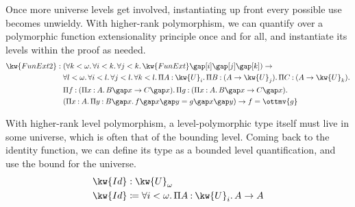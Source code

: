 \documentclass[a4paper,UKenglish,cleveref,autoref,thm-restate]{lipics-v2021}
\begin{document}
Once more universe levels get involved,
instantiating up front every possible use becomes unwieldy.
With higher-rank polymorphism,
we can quantify over a polymorphic function extensionality principle once and for all,
and instantiate its levels within the proof as needed.
%
\begin{align*}
   \kw{ FunExt2 }  &:   (     \forall  k  <   \omega   \mathpunct{.}   \forall  i  <  k  \mathpunct{.}   \forall  j  <  k  \mathpunct{.}   \kw{ FunExt }      \gap [  i  ]   \gap [  j  ]   \gap [  k  ]  )   \to   \relax   \\
  &\phantom{{} : {}}  \forall  l  <   \omega   \mathpunct{.}   \forall  i  <  l  \mathpunct{.}   \forall  j  <  l  \mathpunct{.}   \forall  k  <  l  \mathpunct{.}   \Pi  A  \mathbin{:}   \kw{U}_{ i }   \mathpunct{.}   \Pi  B  \mathbin{:}   (  A  \to   \kw{U}_{ j }   )   \mathpunct{.}   \Pi  C  \mathbin{:}   (  A  \to   \kw{U}_{ k }   )   \mathpunct{.}   \relax         \\
  &\phantom{{} : {}}  \Pi  f  \mathbin{:}   (     \Pi  x  \mathbin{:}  A  \mathpunct{.}  B   \gap  x   \to  C   \gap  x  )   \mathpunct{.}   \Pi  g  \mathbin{:}   (     \Pi  x  \mathbin{:}  A  \mathpunct{.}  B   \gap  x   \to  C   \gap  x  )   \mathpunct{.}   \relax    \\
  &\phantom{{} : {}}   (       \Pi  x  \mathbin{:}  A  \mathpunct{.}   \Pi  y  \mathbin{:}   B  \gap  x   \mathpunct{.}  f    \gap  x   \gap  y   =  g   \gap  x   \gap  y  )   \to    f  =  \ottmv{g}   
\end{align*}

With higher-rank level polymorphism,
a level-polymorphic type itself must live in some universe,
which is often that of the bounding level.
Coming back to the identity function,
we can define its type as a bounded level quantification,
and use the bound for the universe.
%
\begin{align*}
   \kw{ Id }  &:  \kw{U}_{  \omega  }  \\
   \kw{ Id }  &\coloneqq   \forall  i  <   \omega   \mathpunct{.}   \Pi  A  \mathbin{:}   \kw{U}_{ i }   \mathpunct{.}  A    \to  A 
\end{align*}
\end{document}
